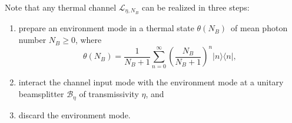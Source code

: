 \documentclass[apsrev,twocolumn]{revtex4-1}%
\begin{document}
Note that any thermal channel $\mathcal{L}_{\eta,N_{B}}$ can be realized in
three steps:

\begin{enumerate}
\item prepare an environment mode in a thermal state $\theta(N_{B})$\ of mean
photon number $N_{B}\geq0$, where%
\begin{equation}
\theta(N_{B})=\frac{1}{N_{B}+1}\sum_{n=0}^{\infty}\left(  \frac{N_{B}}%
{N_{B}+1}\right)  ^{n}|n\rangle\langle n|,
\end{equation}


\item interact the channel input mode with the environment mode at a unitary
beamsplitter $\mathcal{B}_{\eta}$ of transmissivity $\eta$, and

\item discard the environment mode.
\end{enumerate}
\end{document}
